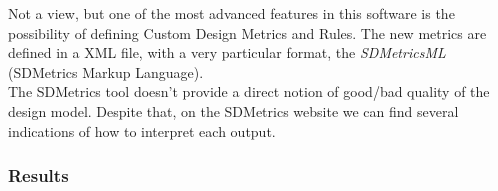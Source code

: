 Not a view, but one of the most advanced features in this software is the possibility of defining Custom Design Metrics and Rules. The new metrics are defined in a XML file, with a very particular format, the \textit{SDMetricsML} (SDMetrics Markup Language). \\
The SDMetrics tool doesn't provide a direct notion of good/bad quality of the design model. Despite that, on the SDMetrics website we can find several indications of how to interpret each output. 
 
\subsubsection{Results}
